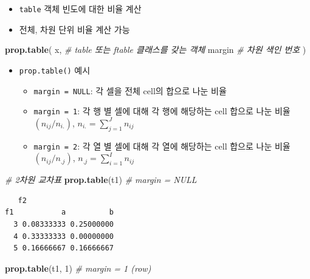 \documentclass[
  11pt,
]{krantz}
\newenvironment{Shaded}{\begin{snugshade}}{\end{snugshade}}
\newcommand{\CommentTok}[1]{\textcolor[rgb]{0.37,0.37,0.37}{\textit{#1}}}
\newcommand{\DecValTok}[1]{\textcolor[rgb]{0.06,0.06,0.06}{#1}}
\newcommand{\KeywordTok}[1]{\textcolor[rgb]{0.27,0.27,0.27}{\textbf{#1}}}
\newcommand{\NormalTok}[1]{#1}
\providecommand{\tightlist}{%
  \setlength{\itemsep}{0pt}\setlength{\parskip}{0pt}}
\begin{document}
\begin{itemize}
\tightlist
\item
  \texttt{table} 객체 빈도에 대한 비율 계산
\item
  전체, 차원 단위 비율 계산 가능
\end{itemize}

\footnotesize

\begin{Shaded}
\begin{Highlighting}[]
\KeywordTok{prop.table}\NormalTok{(}
\NormalTok{  x,  }\CommentTok{# table 또는 ftable 클래스를 갖는 객체}
\NormalTok{  margin }\CommentTok{# 차원 색인 번호}
\NormalTok{)}
\end{Highlighting}
\end{Shaded}

\normalsize

\begin{itemize}
\tightlist
\item
  \texttt{prop.table()} 예시

  \begin{itemize}
  \tightlist
  \item
    \texttt{margin\ =\ NULL}: 각 셀을 전체 cell의 합으로 나눈 비율
  \item
    \texttt{margin\ =\ 1}: 각 행 별 셀에 대해 각 행에 해당하는 cell 합으로 나눈 비율 \((n_{ij}/n_{i.})\), \(n_{i.} = \sum_{j=1}^{J} n_{ij}\)
  \item
    \texttt{margin\ =\ 2}: 각 열 별 셀에 대해 각 열에 해당하는 cell 합으로 나눈 비율 \((n_{ij}/n_{.j})\), \(n_{.j} = \sum_{i=1}^{I} n_{ij}\)
  \end{itemize}
\end{itemize}

\footnotesize

\begin{Shaded}
\begin{Highlighting}[]
\CommentTok{# 2차원 교차표}
\KeywordTok{prop.table}\NormalTok{(t1) }\CommentTok{# margin = NULL}
\end{Highlighting}
\end{Shaded}

\begin{verbatim}
   f2
f1           a          b
  3 0.08333333 0.25000000
  4 0.33333333 0.00000000
  5 0.16666667 0.16666667
\end{verbatim}

\begin{Shaded}
\begin{Highlighting}[]
\KeywordTok{prop.table}\NormalTok{(t1, }\DecValTok{1}\NormalTok{) }\CommentTok{# margin = 1 (row)}
\end{Highlighting}
\end{Shaded}
\end{document}
